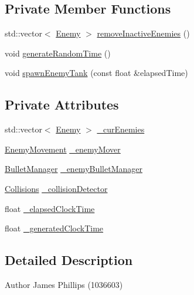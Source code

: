 \subsection*{Private Member Functions}
\begin{DoxyCompactItemize}
\item 
std\+::vector$<$ \hyperlink{class_enemy}{Enemy} $>$ \hyperlink{class_enemy_manager_a206ef948ffa7e4d518da91dad493efe6}{remove\+Inactive\+Enemies} ()
\item 
void \hyperlink{class_enemy_manager_a4b6f8823d43203930ab98035fe808a55}{generate\+Random\+Time} ()
\item 
void \hyperlink{class_enemy_manager_aecc9136f37db0fb4ce451c3849ecde5d}{spawn\+Enemy\+Tank} (const float \&elapsed\+Time)
\end{DoxyCompactItemize}
\subsection*{Private Attributes}
\begin{DoxyCompactItemize}
\item 
std\+::vector$<$ \hyperlink{class_enemy}{Enemy} $>$ \hyperlink{class_enemy_manager_aa1907b3a1c7068e8feca0f8462ea8a6d}{\+\_\+cur\+Enemies}
\item 
\hyperlink{class_enemy_movement}{Enemy\+Movement} \hyperlink{class_enemy_manager_ade1b38d513c67ab3d461639c1d7c7bad}{\+\_\+enemy\+Mover}
\item 
\hyperlink{class_bullet_manager}{Bullet\+Manager} \hyperlink{class_enemy_manager_a10472fca1f8ea20212b47512ce22382e}{\+\_\+enemy\+Bullet\+Manager}
\item 
\hyperlink{class_collisions}{Collisions} \hyperlink{class_enemy_manager_ab0dfb92601feacf2de9b92c2a11468bf}{\+\_\+collision\+Detector}
\item 
float \hyperlink{class_enemy_manager_a3d77691b9f7e4af466de4eeb0982a7d0}{\+\_\+elapsed\+Clock\+Time}
\item 
float \hyperlink{class_enemy_manager_acc7728a6a32d399ca416558f7b769090}{\+\_\+generated\+Clock\+Time}
\end{DoxyCompactItemize}


\subsection{Detailed Description}
\begin{DoxyAuthor}{Author}
James Phillips (1036603) 
\end{DoxyAuthor}


